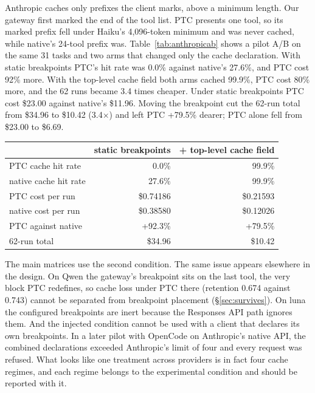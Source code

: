 \documentclass[10pt]{article}
\newenvironment{inlinetable}{\par\medskip\noindent\begin{minipage}{\linewidth}\centering\small}{\end{minipage}\par\bigskip}
\begin{document}
Anthropic caches only prefixes the client marks, above a minimum length. Our gateway first marked the
end of the tool list. PTC presents one tool, so its marked prefix fell under Haiku's 4,096-token
minimum and was never cached, while native's 24-tool prefix was. Table~\ref{tab:anthropicab} shows a
pilot A/B on the same 31 tasks and two arms that changed only the cache declaration. With static
breakpoints PTC's hit rate was 0.0\% against native's 27.6\%, and PTC cost 92\% more. With the
top-level cache field both arms cached 99.9\%, PTC cost 80\% more, and the 62 runs became 3.4 times
cheaper. Under static breakpoints PTC cost \$23.00 against native's \$11.96. Moving the breakpoint
cut the 62-run total from \$34.96 to \$10.42 (3.4$\times$) and left PTC +79.5\% dearer; PTC alone fell
from \$23.00 to \$6.69.

\begin{inlinetable}
\label{tab:anthropicab}
\begin{tabular}{@{}lrr@{}}
\toprule
 & static breakpoints & + top-level cache field \\
\midrule
PTC cache hit rate & 0.0\% & 99.9\% \\
native cache hit rate & 27.6\% & 99.9\% \\
PTC cost per run & \$0.74186 & \$0.21593 \\
native cost per run & \$0.38580 & \$0.12026 \\
PTC against native & +92.3\% & +79.5\% \\
62-run total & \$34.96 & \$10.42 \\
\bottomrule
\end{tabular}
\end{inlinetable}

The main matrices use the second condition. The same issue appears elsewhere in the design. On Qwen
the gateway's breakpoint sits on the last tool, the very block PTC redefines, so cache loss under PTC
there (retention 0.674 against 0.743) cannot be separated from breakpoint placement
(\S\ref{sec:survives}). On luna the configured breakpoints are inert because the Responses API path
ignores them. And the injected condition cannot be used with a client that declares its own
breakpoints. In a later pilot with OpenCode on Anthropic's native API, the combined declarations
exceeded Anthropic's limit of four and every request was refused. What looks like one treatment
across providers is in fact four cache regimes, and each regime belongs to the experimental condition
and should be reported with it.
\end{document}
